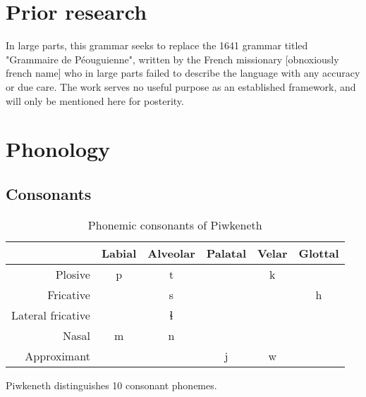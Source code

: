 \documentclass[smallroyalvopaper,9pt]{memoir}
\newcommand{\lang}{Piwkeneth}
\newcommand{\langeng}{Piwken}
\begin{document}
\chapter{Prior research}

In large parts, this grammar seeks to replace the 1641 grammar titled "Grammaire de Péouguienne", written by the French missionary [obnoxiously french name] who in large parts failed to describe the language with any accuracy or due care. The work serves no useful purpose as an established framework, and will only be mentioned here for posterity.

\chapter{Phonology}


\section{Consonants}

\begin{table}[ht]
    \centering
    \begin{tabular}{rccccc}
        \toprule
        & Labial & Alveolar & Palatal & Velar & Glottal \\
        \midrule
        Plosive & p & t & & k & \\
        Fricative & & s & & & h \\
        Lateral fricative & & ɬ & & & \\
        Nasal & m & n & & & \\
        Approximant & & & j & w & \\
        \bottomrule
    \end{tabular}
    \caption{Phonemic consonants of \lang}
\end{table}


\lang{} distinguishes 10 consonant phonemes.

\end{document}
